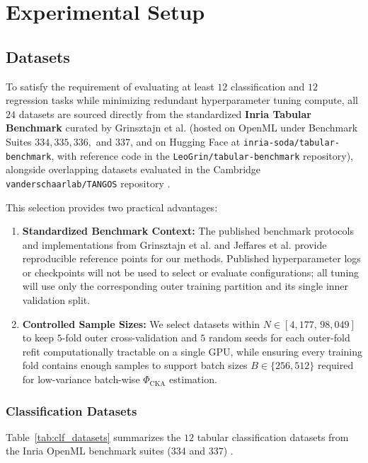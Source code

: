 \documentclass[11pt, a4paper]{article}
\begin{document}
\section{Experimental Setup}

\subsection{Datasets}
To satisfy the requirement of evaluating at least $12$ classification and $12$ regression tasks while minimizing redundant hyperparameter tuning compute, all $24$ datasets are sourced directly from the standardized \textbf{Inria Tabular Benchmark} curated by Grinsztajn et al. \cite{grinsztajn2022why} (hosted on OpenML under Benchmark Suites $334, 335, 336,$ and $337$, and on Hugging Face at \texttt{inria-soda/tabular-benchmark}, with reference code in the \texttt{LeoGrin/tabular-benchmark} repository), alongside overlapping datasets evaluated in the Cambridge \texttt{vanderschaarlab/TANGOS} repository \cite{jeffares2023tangos}.

This selection provides two practical advantages:
\begin{enumerate}
    \item \textbf{Standardized Benchmark Context:} The published benchmark protocols and implementations from Grinsztajn et al. \cite{grinsztajn2022why} and Jeffares et al. \cite{jeffares2023tangos} provide reproducible reference points for our methods. Published hyperparameter logs or checkpoints will not be used to select or evaluate configurations; all tuning will use only the corresponding outer training partition and its single inner validation split.
    \item \textbf{Controlled Sample Sizes:} We select datasets within $N \in [4{,}177, \, 98{,}049]$ to keep $5$-fold outer cross-validation and $5$ random seeds for each outer-fold refit computationally tractable on a single GPU, while ensuring every training fold contains enough samples to support batch sizes $B \in \{256, 512\}$ required for low-variance batch-wise $\Phi_{\text{CKA}}$ estimation.
\end{enumerate}

\subsubsection{Classification Datasets}
Table~\ref{tab:clf_datasets} summarizes the $12$ tabular classification datasets from the Inria OpenML benchmark suites ($334$ and $337$) \cite{grinsztajn2022why}.
\end{document}
